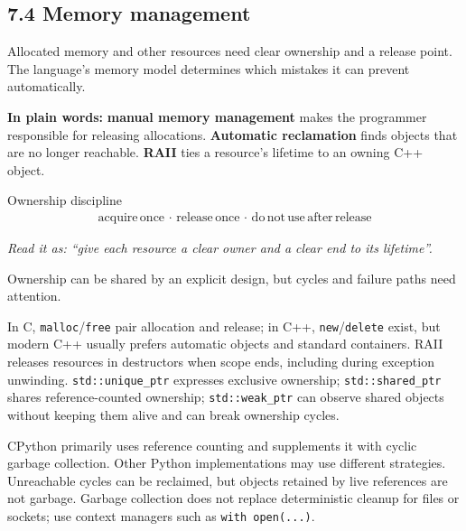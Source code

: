 \documentclass[11pt]{article}
\begin{document}
\begin{keepsection}
\section{7.4 Memory management}

Allocated memory and other resources need clear ownership and a release point. The language’s memory model determines which mistakes it can prevent automatically.

\begin{plainbox}\textbf{In plain words:} \textbf{manual memory management} makes the programmer responsible for releasing allocations. \textbf{Automatic reclamation} finds objects that are no longer reachable. \textbf{RAII} ties a resource’s lifetime to an owning C++ object.\end{plainbox}

\begin{equationcard}{Ownership discipline}
\[ \begin{gathered} \text{acquire}\, \text{once}\, \cdot \, \text{release}\, \text{once}\, \cdot \, \text{do}\, \text{not}\, \text{use}\, \text{after}\, \text{release} \end{gathered} \]
{\small \emph{Read it as: “give each resource a clear owner and a clear end to its lifetime”.}\par Ownership can be shared by an explicit design, but cycles and failure paths need attention.}
\end{equationcard}

In C, \texttt{malloc}/\texttt{free} pair allocation and release; in C++, \texttt{new}/\texttt{delete} exist, but modern C++ usually prefers automatic objects and standard containers. RAII releases resources in destructors when scope ends, including during exception unwinding. \texttt{std::unique\_ptr} expresses exclusive ownership; \texttt{std::shared\_ptr} shares reference-counted ownership; \texttt{std::weak\_ptr} can observe shared objects without keeping them alive and can break ownership cycles.

CPython primarily uses reference counting and supplements it with cyclic garbage collection. Other Python implementations may use different strategies. Unreachable cycles can be reclaimed, but objects retained by live references are not garbage. Garbage collection does not replace deterministic cleanup for files or sockets; use context managers such as \texttt{with open(...)}.


\end{keepsection}
\end{document}
